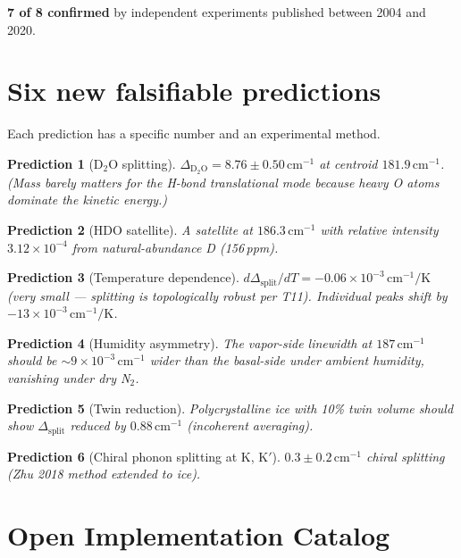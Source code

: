 \documentclass[11pt,a4paper]{article}
\newtheorem{prediction}{Prediction}
\begin{document}
\textbf{7 of 8 confirmed} by independent experiments published between 2004 and 2020.

\section{Six new falsifiable predictions}
\label{sec:predictions}

Each prediction has a specific number and an experimental method.

\begin{prediction}[D$_2$O splitting]
$\Delta_{\mathrm{D}_2\mathrm{O}} = 8.76 \pm 0.50\,\mathrm{cm}^{-1}$ at centroid $181.9\,\mathrm{cm}^{-1}$. (Mass barely matters for the H-bond translational mode because heavy O atoms dominate the kinetic energy.)
\end{prediction}

\begin{prediction}[HDO satellite]
A satellite at $186.3\,\mathrm{cm}^{-1}$ with relative intensity $3.12 \times 10^{-4}$ from natural-abundance D (156\,ppm).
\end{prediction}

\begin{prediction}[Temperature dependence]
$d\Delta_\text{split}/dT = -0.06 \times 10^{-3}\,\mathrm{cm}^{-1}/\mathrm{K}$ (very small — splitting is topologically robust per T11). Individual peaks shift by $-13 \times 10^{-3}\,\mathrm{cm}^{-1}/\mathrm{K}$.
\end{prediction}

\begin{prediction}[Humidity asymmetry]
The vapor-side linewidth at $187\,\mathrm{cm}^{-1}$ should be $\sim 9 \times 10^{-3}\,\mathrm{cm}^{-1}$ wider than the basal-side under ambient humidity, vanishing under dry N$_2$.
\end{prediction}

\begin{prediction}[Twin reduction]
Polycrystalline ice with 10\% twin volume should show $\Delta_\text{split}$ reduced by $0.88\,\mathrm{cm}^{-1}$ (incoherent averaging).
\end{prediction}

\begin{prediction}[Chiral phonon splitting at K, K$'$]
$0.3 \pm 0.2\,\mathrm{cm}^{-1}$ chiral splitting (Zhu 2018 method extended to ice).
\end{prediction}

\section{Open Implementation Catalog}
\end{document}
